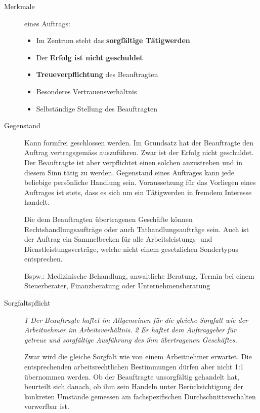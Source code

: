 \begin{description}
  \item[Merkmale] eines Auftrags:
  \begin{itemize}
    \item Im Zentrum steht das \textbf{sorgfältige Tätigwerden}
    \item Der \textbf{Erfolg ist nicht geschuldet}
    \item \textbf{Treueverpflichtung} des Beauftragten
    \item Besonderes Vertrauensverhältnis
    \item Selbständige Stellung des Beauftragten
  \end{itemize}

  \item[Gegenstand] Kann formfrei geschlossen werden. Im Grundsatz hat der Beauftragte den Auftrag vertragsgemäss auszuführen. Zwar ist der Erfolg nicht geschuldet. Der Beauftragte ist aber verpflichtet einen solchen anzustreben und in diesem Sinn tätig zu werden.
  Gegenstand eines Auftrages kann jede beliebige persönliche Handlung sein. Voraussetzung für das Vorliegen eines Auftrages ist stets, dass es sich um ein Tätigwerden in fremdem Interesse handelt.

  Die dem Beauftragten übertragenen Geschäfte können Rechtshandlungsaufträge oder auch Tathandlungsaufträge sein. Auch ist der Auftrag ein Sammelbecken für alle Arbeitsleistungs- und Dienstleistungsverträge, welche nicht einem gesetzlichen Sondertypus entsprechen.

  Bspw.: Medizinische Behandlung, anwaltliche Beratung, Termin bei einem Steuerberater, Finanzberatung oder Unternehmensberatung

  \item[Sorgfaltspflicht] \textit{1 Der Beauftragte haftet im Allgemeinen für die gleiche Sorgfalt wie der Arbeitnehmer im Arbeitsverhältnis.} 
  \textit{2 Er haftet dem Auftraggeber für getreue und sorgfältige Ausführung des ihm übertragenen Geschäftes.}

  Zwar wird die gleiche Sorgfalt wie von einem Arbeitnehmer erwartet. Die entsprechenden arbeitsrechtlichen Bestimmungen dürfen aber nicht 1:1 übernommen werden. Ob der Beauftragte unsorgfältig gehandelt hat, beurteilt sich danach, ob ihm sein Handeln unter Berücksichtigung der konkreten Umstände gemessen am fachspezifischen Durchschnittsverhalten vorwerfbar ist.


\end{description}
